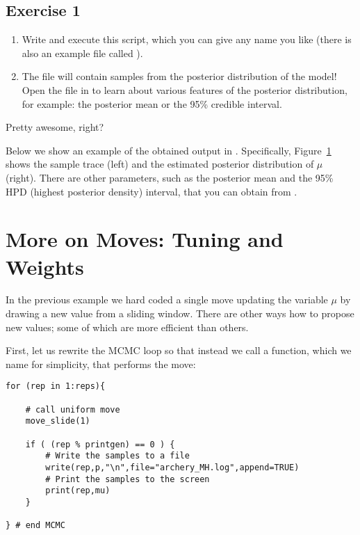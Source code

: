\subsection{Exercise 1}

\begin{enumerate}[label=\textnormal{Step \arabic*)}]
	\item Write and execute this script, which you can give any name you like (there is also an example file called ).
	\item The  file will contain samples from the posterior distribution of the model! Open the file in \Tracer to learn about various features of the posterior distribution, for example: the posterior mean or the 95\% credible interval.
\end{enumerate}
Pretty awesome, right?

Below we show an example of the obtained output in \Tracer.
Specifically, Figure~\ref{fig:mcmc_samples} shows the sample trace (left) and the estimated posterior distribution of $\mu$ (right).
There are other parameters, such as the posterior mean and the 95\% HPD (highest posterior density) interval, that you can obtain from \Tracer.
\begin{figure}[h!]
\centering
{}
\label{fig:mcmc_samples}
\end{figure}
\pagebreak


\section{More on Moves: Tuning and Weights}\label{sect:More_on_Moves}

In the previous example we hard coded a single move updating the variable $\mu$ by drawing a new value from a sliding window.
There are other ways how to propose new values; some of which are more efficient than others.

First, let us rewrite the MCMC loop so that instead we call a function, which we name  for simplicity, that performs the move:
{\tt \begin{snugshade*}
\begin{lstlisting}    
for (rep in 1:reps){
    
    # call uniform move
    move_slide(1)
    
    if ( (rep % printgen) == 0 ) {
        # Write the samples to a file
        write(rep,p,"\n",file="archery_MH.log",append=TRUE)
        # Print the samples to the screen
        print(rep,mu)
    }

} # end MCMC
\end{lstlisting}
\end{snugshade*}}

